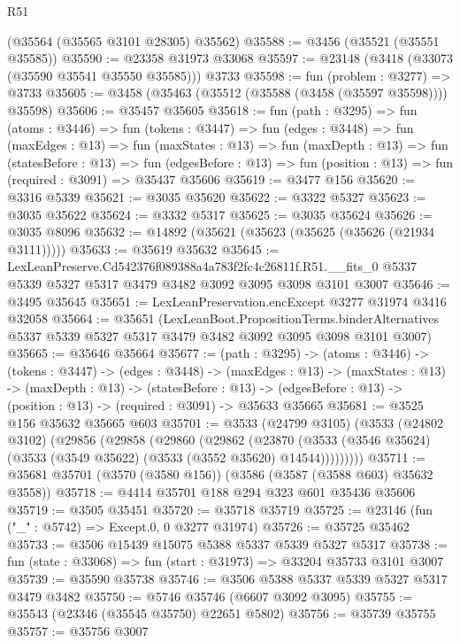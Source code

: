 \begin{lexlean}{R51}
\begin{coremodule}
    (@35564 (@35565 @3101 @28305) @35562)
@35588 := @3456 (@35521 (@35551 @35585))
@35590 := @23358 @31973 @33068
@35597 := @23148 (@3418 (@33073 (@35590 @35541 @35550 @35585))) @3733
@35598 := fun (problem : @3277) => @3733
@35605 := @3458 (@35463 (@35512 (@35588 (@3458 (@35597 @35598)))) @35598)
@35606 := @35457 @35605
@35618 := fun (path : @3295) =>
  fun (atoms : @3446) =>
  fun (tokens : @3447) =>
  fun (edges : @3448) =>
  fun (maxEdges : @13) =>
  fun (maxStates : @13) =>
  fun (maxDepth : @13) =>
  fun (statesBefore : @13) =>
  fun (edgesBefore : @13) => fun (position : @13) => fun (required : @3091) => @35437 @35606
@35619 := @3477 @156
@35620 := @3316 @5339
@35621 := @3035 @35620
@35622 := @3322 @5327
@35623 := @3035 @35622
@35624 := @3332 @5317
@35625 := @3035 @35624
@35626 := @3035 @8096
@35632 := @14892 (@35621 (@35623 (@35625 (@35626 (@21934 @3111)))))
@35633 := @35619 @35632
@35645 := LexLeanPreserve.Cd542376f089388a4a783f2fc4c26811f.R51.__fits_0
    @5337
    @5339
    @5327
    @5317
    @3479
    @3482
    @3092
    @3095
    @3098
    @3101
    @3007
@35646 := @3495 @35645
@35651 := LexLeanPreservation.encExcept @3277 @31974 @3416 @32058
@35664 := @35651
    (LexLeanBoot.PropositionTerms.binderAlternatives
      @5337
      @5339
      @5327
      @5317
      @3479
      @3482
      @3092
      @3095
      @3098
      @3101
      @3007)
@35665 := @35646 @35664
@35677 := (path : @3295) ->
  (atoms : @3446) ->
  (tokens : @3447) ->
  (edges : @3448) ->
  (maxEdges : @13) ->
  (maxStates : @13) ->
  (maxDepth : @13) ->
  (statesBefore : @13) ->
  (edgesBefore : @13) -> (position : @13) -> (required : @3091) -> @35633 @35665
@35681 := @3525 @156 @35632 @35665 @603
@35701 := @3533
    (@24799 @3105)
    (@3533
      (@24802 @3102)
      (@29856
        (@29858
          (@29860
            (@29862
              (@23870
                (@3533 (@3546 @35624) (@3533 (@3549 @35622) (@3533 (@3552 @35620) @14544)))))))))
@35711 := @35681 @35701 (@3570 (@3580 @156)) (@3586 (@3587 (@3588 @603) @35632 @3558))
@35718 := @4414 @35701 @188 @294 @323 @601 @35436 @35606
@35719 := @3505 @35451
@35720 := @35718 @35719
@35725 := @23146 (fun ("_" : @5742) => Except.{0, 0} @3277 @31974)
@35726 := @35725 @35462
@35733 := @3506 @15439 @15075 @5388 @5337 @5339 @5327 @5317
@35738 := fun (state : @33068) => fun (start : @31973) => @33204 @35733 @3101 @3007
@35739 := @35590 @35738
@35746 := @3506 @5388 @5337 @5339 @5327 @5317 @3479 @3482
@35750 := @5746 @35746 (@6607 @3092 @3095)
@35755 := @35543 (@23346 (@35545 @35750) @22651 @5802)
@35756 := @35739 @35755
@35757 := @35756 @3007

\end{coremodule}
\end{lexlean}

